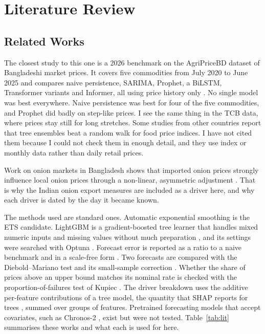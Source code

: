 \chapter{Literature Review}

\section{Related Works}
The closest study to this one is a 2026 benchmark on the AgriPriceBD dataset of Bangladeshi market prices. It covers five commodities from July 2020 to June 2025 and compares naive persistence, SARIMA, Prophet, a BiLSTM, Transformer variants and Informer, all using price history only \cite{agripricebd}. No single model was best everywhere. Naive persistence was best for four of the five commodities, and Prophet did badly on step-like prices. I see the same thing in the TCB data, where prices stay still for long stretches. Some studies from other countries report that tree ensembles beat a random walk for food price indices. I have not cited them because I could not check them in enough detail, and they use index or monthly data rather than daily retail prices.

Work on onion markets in Bangladesh shows that imported onion prices strongly influence local onion prices through a non-linear, asymmetric adjustment \cite{onionnardl}. That is why the Indian onion export measures are included as a driver here, and why each driver is dated by the day it became known.

The methods used are standard ones. Automatic exponential smoothing is the ETS candidate. LightGBM is a gradient-boosted tree learner that handles mixed numeric inputs and missing values without much preparation \cite{lightgbm}, and its settings were searched with Optuna \cite{optuna}. Forecast error is reported as a ratio to a naive benchmark and in a scale-free form \cite{hk2006}. Two forecasts are compared with the Diebold--Mariano test \cite{dm1995} and its small-sample correction \cite{hln1997}. Whether the share of prices above an upper bound matches its nominal rate is checked with the proportion-of-failures test of Kupiec \cite{kupiec}. The driver breakdown uses the additive per-feature contributions of a tree model, the quantity that SHAP reports for trees \cite{shap}, summed over groups of features. Pretrained forecasting models that accept covariates, such as Chronos-2 \cite{chronos2}, exist but were not tested. Table~\ref{tab:lit} summarises these works and what each is used for here.

